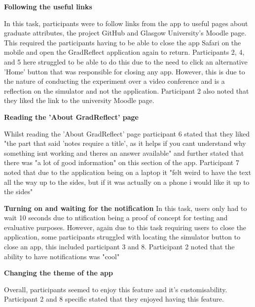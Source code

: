 \documentclass{l4proj}
\begin{document}
\textbf{Following the useful links}
\par
In this task, participants were to follow links from the app to useful pages about graduate attributes, the project
GitHub and Glasgow University's Moodle page. This required the participants having to be able to close the app Safari
on the mobile and open the GradReflect application again to return. Participants 2, 4, and 5 here struggled to be able
to do this due to the need to click an alternative 'Home' button that was responsible for closing any app. However, this
is due to the nature of conducting the experiment over a video conference and is a reflection on the simulator and 
not the application. Participant 2 also noted that they liked the link to the university Moodle page.

\textbf{Reading the 'About GradReflect' page}
\par
Whilst reading the 'About GradReflect' page participant 6 stated that they liked "the part that said 
'notes require a title', as it helps if you cant understand why something isnt working and theres an answer available" and
further stated that there was "a lot of good information" on this section of the app. Participant 7 noted that due to the 
application being on a laptop it "felt weird to have the text all the way up to the sides, but if it was actually on
a phone i would like it up to the sides"

\textbf{Turning on and waiting for the notification}
In this task, users only had to wait 10 seconds due to ntification being a proof of concept for testing and evaluative
purposes. However, again due to this task requiring users to close the application, some participants struggled with 
locating the simulator button to close an app, this included participant 3 and 8. Participant 2 noted that the ability to
have notifications was "cool"

\textbf{Changing the theme of the app}
\par 
Overall, participants seemed to enjoy this feature and it's customisability. Participant 2 and 8 specific stated that 
they enjoyed having this feature.
\end{document}
